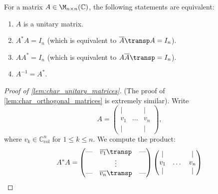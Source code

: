 \begin{lemma}
\label{lem:char_unitary_matrices}
For a matrix $A \in \M_{n \times n}(\mathbb{C})$, the following statements are equivalent:
\begin{enumerate}[label=\textbf{(\alph*)}]
    \item $A$ is a unitary matrix.
    \item $A^* A = I_n$ (which is equivalent to $\overline{A}\transp A = I_n$).
    \item $A A^* = I_n$ (which is equivalent to $A \overline{A}\transp = I_n$).
    \item $A^{-1} = A^*$.
\end{enumerate}
\end{lemma}

\begin{proof}[Proof of \cref{lem:char_unitary_matrices}]
(The proof of \cref{lem:char_orthogonal_matrices} is extremely similar).
Write
\[
    A = \begin{pmatrix} | & & | \\ v_1 & \dots & v_n \\ | & & | \end{pmatrix},
\]
where $v_k \in \mathbb{C}_{\text{col}}^n$ for $1 \leq k \leq n$. We compute the product:
\begin{align}
    A^* A &= \begin{pmatrix} \text{---} & \overline{v_1}\transp & \text{---} \\ & \vdots & \\ \text{---} & \overline{v_n}\transp & \text{---} \end{pmatrix} \begin{pmatrix} | & & | \\ v_1 & \dots & v_n \\ | & & | \end{pmatrix} \nonumber \\

\end{align}
\end{proof}
